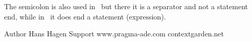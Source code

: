 The semicolon is also used in \PASCAL\ but there it is a separator and not a
statement end, while in \METAPOST\ it does end a statement (expression).

\stopsection

\stopsection

\startsubject[title=Colofon]

\starttabulate
\NC Author      \NC Hans Hagen         \NC \NR
\NC \CONTEXT    \NC \contextversion    \NC \NR
\NC \LUAMETATEX \NC \texengineversion  \NC \NR
\NC Support     \NC www.pragma-ade.com \NC \NR
\NC             \NC contextgarden.net  \NC \NR
\stoptabulate

\stopsubject

\stopdocument
